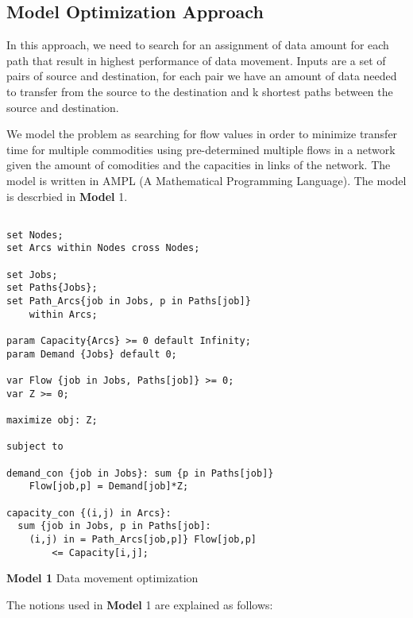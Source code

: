 \subsection{Model Optimization Approach}
\label{sec:optimization}

In this approach, we need to search for an assignment of data amount for each path that result in highest performance of data movement. Inputs are a set of pairs of source and destination, for each pair we have an amount of data needed to transfer from the source to the destination and k shortest paths between the source and destination.

We model the problem as searching for flow values in order to  minimize transfer time for multiple commodities using pre-determined multiple flows in a network given the amount of comodities and the capacities in links of the network. The model is written in AMPL (A Mathematical Programming Language). The model is descrbied in \textbf{Model} 1.

\begin{algorithm}[!htbp]

\begingroup
\fontsize{9pt}{9pt}\selectfont

\begin{verbatim}

set Nodes;
set Arcs within Nodes cross Nodes;

set Jobs;
set Paths{Jobs};
set Path_Arcs{job in Jobs, p in Paths[job]} 
    within Arcs;

param Capacity{Arcs} >= 0 default Infinity;
param Demand {Jobs} default 0;

var Flow {job in Jobs, Paths[job]} >= 0;
var Z >= 0;

maximize obj: Z;

subject to

demand_con {job in Jobs}: sum {p in Paths[job]} 
	Flow[job,p] = Demand[job]*Z;

capacity_con {(i,j) in Arcs}:
  sum {job in Jobs, p in Paths[job]: 
    (i,j) in = Path_Arcs[job,p]} Flow[job,p] 
		<= Capacity[i,j];

\end{verbatim}

\endgroup

\caption*{\textbf{Model 1} Data movement optimization}
\label{mod:opt}

\end{algorithm}

The notions used in \textbf{Model} 1 are explained as follows:

